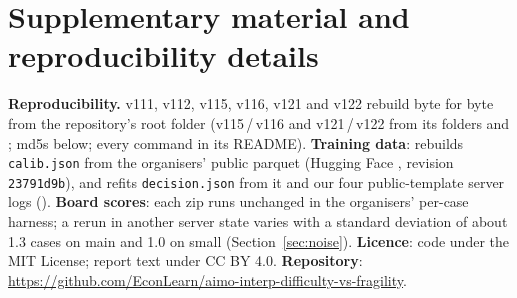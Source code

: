 \documentclass{article}
\begin{document}
\appendix

\section{Supplementary material and reproducibility details}
\label{app:supp}

\textbf{Reproducibility.} v111, v112, v115, v116, v121 and v122 rebuild byte for byte from the repository's root folder
(v115\,/\,v116 and v121\,/\,v122 from its folders  and ; md5s below; every command in
its README). \textbf{Training data}:  rebuilds \texttt{calib.json} from the organisers'
public parquet (Hugging Face , revision \texttt{23791d9b}), and
 refits \texttt{decision.json} from it and our four public-template server logs
(). \textbf{Board scores}: each zip runs unchanged in the organisers' per-case harness; a rerun in
another server state varies with a standard deviation of about 1.3 cases on main and 1.0 on small (Section~\ref{sec:noise}).
\textbf{Licence}: code under the MIT License; report text under CC BY 4.0. \textbf{Repository}: \url{https://github.com/EconLearn/aimo-interp-difficulty-vs-fragility}.
\end{document}
